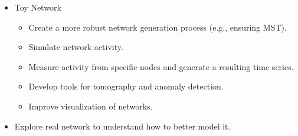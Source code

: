 \documentclass{weeklyreport}
\begin{document}
\begin{itemize}
    \item Toy Network
    \begin{itemize}
        \item Create a more robust network generation process (e.g., ensuring MST).
        \item Simulate network activity.
        \item Measure activity from specific nodes and generate a resulting time series.
        \item Develop tools for tomography and anomaly detection.
        \item Improve visualization of networks.
    \end{itemize}
    \item Explore real network to understand how to better model it.
\end{itemize}
\end{document}
